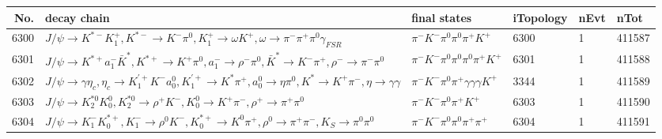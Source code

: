 \begin{table}[htbp] 
\begin{center}
\begin{small}
\begin{tabular}{rlllll}\hline\hline
 No. & decay chain & final states &  iTopology & nEvt & nTot \\\hline
6300&$J/\psi       \rightarrow K^{*-}         K_1^{+}        , K^{*-}          \rightarrow K^{-}          \pi^{0}        , K_1^{+}         \rightarrow \omega         K^{+}          , \omega          \rightarrow \pi^{-}        \pi^{+}        \pi^{0}        \gamma_{FSR} $&$\pi^{-}        K^{-}          \pi^{0}        \pi^{0}        \pi^{+}        K^{+}          $& 6300&    1&411587\\
6301&$J/\psi       \rightarrow K^{*+}         a_{1}^{-}      \bar{K}^{*}   , K^{*+}          \rightarrow K^{+}          \pi^{0}        , a_{1}^{-}       \rightarrow \rho^{-}      \pi^{0}        , \bar{K}^{*}    \rightarrow K^{-}          \pi^{+}        , \rho^{-}       \rightarrow \pi^{-}        \pi^{0}        $&$\pi^{-}        K^{-}          \pi^{0}        \pi^{0}        \pi^{0}        \pi^{+}        K^{+}          $& 6301&    1&411588\\
6302&$J/\psi       \rightarrow \gamma       \eta_{c}    , \eta_{c}     \rightarrow K_1^{'+}      K^{-}          a_{0}^{0}      , K_1^{'+}       \rightarrow K^{*}          \pi^{+}        , a_{0}^{0}       \rightarrow \eta          \pi^{0}        , K^{*}           \rightarrow K^{+}          \pi^{-}        , \eta           \rightarrow \gamma       \gamma       $&$\pi^{-}        K^{-}          \pi^{0}        \pi^{+}        \gamma       \gamma       \gamma       K^{+}          $& 3344&    1&411589\\
6303&$J/\psi       \rightarrow K_2^{*0}       K_0^{0}        , K_2^{*0}        \rightarrow \rho^{+}      K^{-}          , K_0^{0}         \rightarrow K^{+}          \pi^{-}        , \rho^{+}       \rightarrow \pi^{+}        \pi^{0}        $&$\pi^{-}        K^{-}          \pi^{0}        \pi^{+}        K^{+}          $& 6303&    1&411590\\
6304&$J/\psi       \rightarrow K_{1}^{-}      K_{0}^{*+}     , K_{1}^{-}       \rightarrow \rho^{0}      K^{-}          , K_{0}^{*+}      \rightarrow K^{0}          \pi^{+}        , \rho^{0}       \rightarrow \pi^{+}        \pi^{-}        , K_{S}           \rightarrow \pi^{0}        \pi^{0}        $&$\pi^{-}        K^{-}          \pi^{0}        \pi^{0}        \pi^{+}        \pi^{+}        $& 6304&    1&411591\\

\end{tabular}
\end{small}
\end{center}
\end{table}
